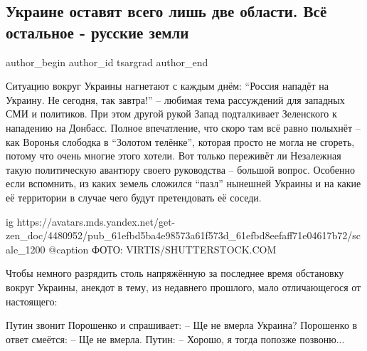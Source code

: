  
 
 
 
 
 
\subsection{Украине оставят всего лишь две области. Всё остальное - русские земли}
\label{sec:25_01_2022.yz.tsargrad.1.ukraina_dve_oblasti}
 
\ifcmt
 author_begin
   author_id tsargrad
 author_end
\fi

Ситуацию вокруг Украины нагнетают с каждым днём: \enquote{Россия нападёт на Украину. Не
сегодня, так завтра!} – любимая тема рассуждений для западных СМИ и политиков.
При этом другой рукой Запад подталкивает Зеленского к нападению на Донбасс.
Полное впечатление, что скоро там всё равно полыхнёт – как Воронья слободка в
\enquote{Золотом телёнке}, которая просто не могла не сгореть, потому что очень многие
этого хотели. Вот только переживёт ли Незалежная такую политическую авантюру
своего руководства – большой вопрос. Особенно если вспомнить, из каких земель
сложился \enquote{пазл} нынешней Украины и на какие её территории в случае чего будут
претендовать её соседи.

\ifcmt
  ig https://avatars.mds.yandex.net/get-zen_doc/4480952/pub_61efbd5ba4e98573a61f573d_61efbd8eefaff71e04617b72/scale_1200
  @caption ФОТО: VIRTIS/SHUTTERSTOCK.COM
\fi

Чтобы немного разрядить столь напряжённую за последнее время обстановку вокруг
Украины, анекдот в тему, из недавнего прошлого, мало отличающегося от
настоящего:

\begin{zznagolos}
Путин звонит Порошенко и спрашивает: – Ще не вмерла Украина? Порошенко в ответ
смеётся: – Ще не вмерла. Путин: – Хорошо, я тогда попозже позвоню...	
\end{zznagolos}

